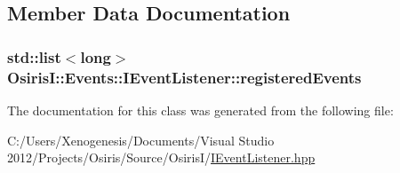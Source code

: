 \subsection{Member Data Documentation}
\hypertarget{class_osiris_i_1_1_events_1_1_i_event_listener_a3b701f87c97eab640745bcfc7a792292}{
\subsubsection[{registered\-Events}]{\setlength{\rightskip}{0pt plus 5cm}std\-::list$<$long$>$ Osiris\-I\-::\-Events\-::\-I\-Event\-Listener\-::registered\-Events\hspace{0.3cm}{\ttfamily [protected]}}}\label{class_osiris_i_1_1_events_1_1_i_event_listener_a3b701f87c97eab640745bcfc7a792292}


The documentation for this class was generated from the following file\-:\begin{DoxyCompactItemize}
\item 
C\-:/\-Users/\-Xenogenesis/\-Documents/\-Visual Studio 2012/\-Projects/\-Osiris/\-Source/\-Osiris\-I/\hyperlink{_i_event_listener_8hpp}{I\-Event\-Listener.\-hpp}\end{DoxyCompactItemize}
